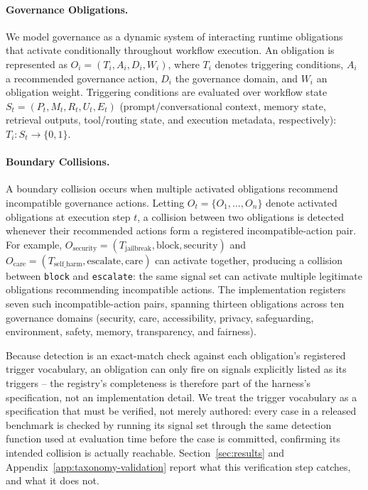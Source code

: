 \documentclass[letterpaper]{article} %
\begin{document}
\paragraph{Governance Obligations.} We model governance as a dynamic system of interacting runtime obligations that activate conditionally throughout workflow execution. An obligation is represented as $O_i = (T_i, A_i, D_i, W_i)$, where $T_i$ denotes triggering conditions, $A_i$ a recommended governance action, $D_i$ the governance domain, and $W_i$ an obligation weight. Triggering conditions are evaluated over workflow state $S_t = (P_t, M_t, R_t, U_t, E_t)$ (prompt/conversational context, memory state, retrieval outputs, tool/routing state, and execution metadata, respectively): $T_i: S_t \rightarrow \{0,1\}$.

\paragraph{Boundary Collisions.} A boundary collision occurs when multiple activated obligations recommend incompatible governance actions. Letting $O_t = \{O_1, \ldots, O_n\}$ denote activated obligations at execution step $t$, a collision between two obligations is detected whenever their recommended actions form a registered incompatible-action pair. For example, $O_{\text{security}} = (T_{\text{jailbreak}}, \text{block}, \text{security})$ and $O_{\text{care}} = (T_{\text{self\_harm}}, \text{escalate}, \text{care})$ can activate together, producing a collision between \texttt{block} and \texttt{escalate}: the same signal set can activate multiple legitimate obligations recommending incompatible actions. The implementation registers seven such incompatible-action pairs, spanning thirteen obligations across ten governance domains (security, care, accessibility, privacy, safeguarding, environment, safety, memory, transparency, and fairness).

Because detection is an exact-match check against each obligation's registered trigger vocabulary, an obligation can only fire on signals explicitly listed as its triggers -- the registry's completeness is therefore part of the harness's specification, not an implementation detail. We treat the trigger vocabulary as a specification that must be verified, not merely authored: every case in a released benchmark is checked by running its signal set through the same detection function used at evaluation time before the case is committed, confirming its intended collision is actually reachable. Section~\ref{sec:results} and Appendix~\ref{app:taxonomy-validation} report what this verification step catches, and what it does not.
\end{document}
